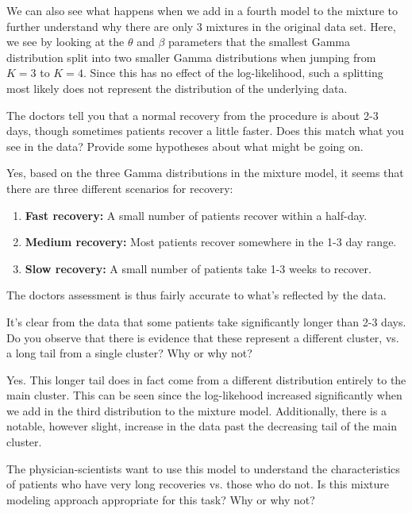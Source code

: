 \documentclass[expanded]{lkx_pset}
\begin{document}
\begin{parts}
	We can also see what happens when we add in a fourth model to the mixture to further understand why there are only 3 mixtures in the original data set. Here, we see by looking at the $\theta$ and $\beta$ parameters that the smallest Gamma distribution split into two smaller Gamma distributions when jumping from $K=3$ to $K=4$. Since this has no effect of the log-likelihood, such a splitting most likely does not represent the distribution of the underlying data.

	\begin{part}{4} The doctors tell you that a normal recovery from the procedure
		is about 2-3 days, though sometimes patients recover a little
		faster. Does this match what you see in the data?  Provide some
		hypotheses about what might be going on.
	\end{part}

	Yes, based on the three Gamma distributions in the mixture model, it seems that there are three different scenarios for recovery:
	\begin{enumerate}
		\item \textbf{Fast recovery:} A small number of patients recover within a half-day.
		\item \textbf{Medium recovery:} Most patients recover somewhere in the 1-3 day range.
		\item \textbf{Slow recovery:} A small number of patients take 1-3 weeks to recover.
	\end{enumerate}
	The doctors assessment is thus fairly accurate to what's reflected by the data.

	\begin{part}{5} It's clear from the data that some patients take significantly
		longer than 2-3 days.  Do you observe that there is evidence that
		these represent a different cluster, vs. a long tail from a single
		cluster?  Why or why not?
	\end{part}

	Yes. This longer tail does in fact come from a different distribution entirely to the main cluster. This can be seen since the log-likehood increased significantly when we add in the third distribution to the mixture model. Additionally, there is a notable, however slight, increase in the data past the decreasing tail of the main cluster.

	\begin{part}{6} The physician-scientists want to use this model to understand
		the characteristics of patients who have very long recoveries
		vs. those who do not.  Is this mixture modeling approach appropriate
		for this task?  Why or why not?
	\end{part}


\end{parts}
\end{document}
